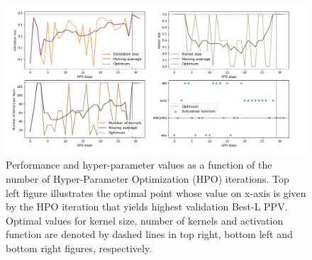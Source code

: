     \begin{figure}[H]
        \begin{center}
            \includegraphics[width=\textwidth, keepaspectratio]{imgs/hpo2.png}
            \caption{Performance and hyper-parameter values as a function of the number
            of Hyper-Parameter Optimization (HPO) iterations.
            Top left figure illustrates the optimal point whose value on x-axis
            is given by the HPO iteration that yields highest validation Best-L PPV.
            Optimal values for kernel size, number of kernels and activation function are denoted
            by dashed lines in top right, bottom left and bottom right figures, respectively.}
            \label{hpoparams2}
        \end{center}
    \end{figure}

